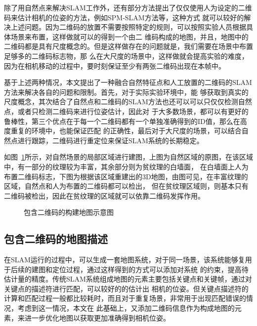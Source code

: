 除了用自然点来解决SLAM工作外，还有部分方法提出了仅仅使用人为设定的二维码来估计相机的位姿的方法，例如SPM-SLAM方法等，这种方式
就可以较好的解决上述问题。因为二维码的放置不需要按照特定的规则，可以按照实验人员根据具体场景来布置，这样做就可以的得到一个由二
维码构成的地图，并且，地图中的二维码都是具有尺度概念的。但是这样做存在的问题就是，我们需要在场景中布置足够多的二维码标志物，那
么在大尺度的场景中，这样做就会提高实验的难度，因为在相机移动的过程中，要时刻保证至少有两张二维码出现在本帧中。

基于上述两种情况，本文提出了一种融合自然特征点和人工放置的二维码的SLAM方法来解决各自的问题和限制。首先，对于实际实验环境中，能
够获取到真实的尺度概念，其次结合了自然点和二维码的SLAM方法也还可以可以只仅仅检测自然点，或者只检测二维码来进行位姿估计，因此对
于大多数场景，都可以有更好的鲁棒性，第三个优点在于每一个二维码都有一个单独准确得到的ID值，那么在高度重复的环境中，也能保证匹配
的正确性，最后对于大尺度的场景，可以结合自然点进行跟踪，二维码进行重定位来保证SLAM系统的长期稳定。

如图~\ref{fig:map}所示，对自然场景的局部区域进行建图，上图为自然区域的原图，在该区域中，有一部分的纹理较为丰富，其余部分则为贫纹理的白墙面，
在白墙面上人为布置二维码标志，下图为根据该区域重建出的3D地图，由图可见，在丰富纹理的区域，自然点和人为布置的二维码都可以检出，
但在贫纹理区域则，则基本只有二维码被检出，因此在贫纹理的区域就可以依靠二维码发挥作用。

\begin{figure}[htbp]
  \centering
  \vskip0.5cm
  \caption{包含二维码的构建地图示意图}\label{fig:map}
  \end{figure}

\subsection{包含二维码的地图描述}
\label{sec:2.3.2}
在SLAM运行的过程中，可以生成一套地图系统，对于同一场景，该系统能够复用于后续的建图和定位过程，通过这样得到的方式可以添加对系统
的约束，提高待估计量的精度。传统SLAM系统组成地图的元素主要包括关键点和关键帧，通过对关键点的描述符进行匹配，可以较好的的估计出
相机的位姿。但关键点描述符的计算和匹配过程一般都比较耗时，而且对于重复场景，非常用于出现匹配错误的情况，考虑到这一情况，本文在
此基础上，又添加二维码信息作为构成地图的元素，来进一步优化地图以获取更加准确得到相机位姿。

